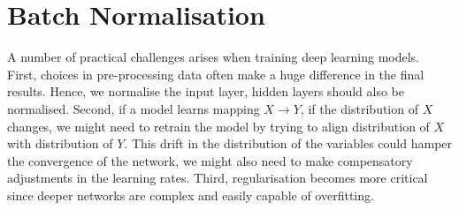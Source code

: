\documentclass[12pt]{report}
\numberwithin{equation}{section}
\begin{document}
\section{Batch Normalisation}
A number of practical challenges arises when training deep learning models. First, choices in pre-processing data often make a huge difference in the final results. Hence, we normalise the input layer, hidden layers should also be normalised. Second, if a model learns mapping $X \rightarrow Y$, if the distribution of $X$ changes, we might need to retrain the model by trying to align distribution of $X$ with distribution of $Y$. This drift in the distribution of the variables could hamper the convergence of the network, we might also need to make compensatory adjustments in the learning rates. Third, regularisation becomes more critical since deeper networks are complex and easily capable of overfitting.  
\end{document}
